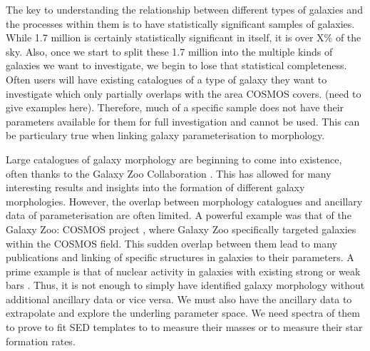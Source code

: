 \documentclass[11pt,usenatbib]{article}
\begin{document}
The key to understanding the relationship between different types of galaxies and the processes within them is to have statistically significant samples of galaxies. While 1.7 million is certainly statistically significant in itself, it is over X\% of the sky. Also, once we start to split these 1.7 million into the multiple kinds of galaxies we want to investigate, we begin to lose that statistical completeness. Often users will have existing catalogues of a type of galaxy they want to investigate which only partially overlaps with the area COSMOS covers. (need to give examples here). Therefore, much of a specific sample does not have their parameters available for them for full investigation and cannot be used. This can be particulary true when linking galaxy parameterisation to morphology.

Large catalogues of galaxy morphology are beginning to come into existence, often thanks to the Galaxy Zoo Collaboration \citep{lintott_08}. This has allowed for many interesting results and insights into the formation of different galaxy morphologies. However, the overlap between morphology catalogues and ancillary data of parameterisation are often limited. A powerful example was that of the Galaxy Zoo: COSMOS project \citep{}, where Galaxy Zoo specifically targeted galaxies within the COSMOS field. This sudden overlap between them lead to many publications and linking of specific structures in galaxies to their parameters. A prime example is that of nuclear activity in galaxies with existing strong or weak bars \citep{papers using cosmos with galaxy zoo}. Thus, it is not enough to simply have identified galaxy morphology without additional ancillary data or vice versa. We must also have the ancillary data to extrapolate and explore the underling parameter space. We need spectra of them to prove to fit SED templates to to measure their masses or to measure their star formation rates. 
\end{document}
